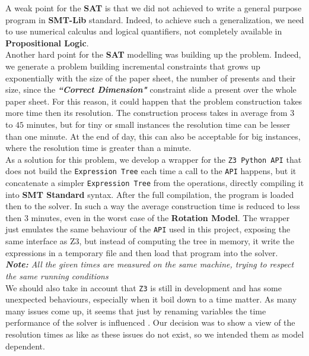 A weak point for the \textbf{SAT} is that we did not achieved to write a general purpose program in \textbf{SMT-Lib} standard. Indeed, to achieve such a generalization, we need to use
numerical calculus and logical quantifiers, not completely available in \textbf{Propositional Logic}.\\

Another hard point for the \textbf{SAT} modelling was building up the problem. Indeed, we generate a problem building incremental constraints that grows up exponentially with the size of
the paper sheet, the number of presents and their size, since the \textbf{\textit{``Correct Dimension"}} constraint slide a present over the whole paper sheet. For this reason, it could happen
that the problem construction takes more time then its resolution. The construction process takes in average from $3$ to $45$ minutes, but for tiny or small instances the resolution time can be lesser
than one minute. At the end of day, this can also be acceptable for big instances, where the resolution time is greater than a minute.
\\
As a solution for this problem, we develop a wrapper for the \texttt{Z3 Python API} that does not build the \texttt{Expression Tree} each time a call to the \texttt{API} happens, but it concatenate a simpler
\texttt{Expression Tree} from the operations, directly compiling it into \textbf{SMT Standard} syntax. After the full compilation, the program is loaded then to the solver.
In such a way the average construction time is reduced to less then $3$ minutes, even in the worst case of the \textbf{Rotation Model}.
The wrapper just emulates the same behaviour of the \texttt{API} used in this project, exposing the same interface as Z3, but instead of computing the tree in memory, it write the expressions in
a temporary file and then load that program into the solver. \\
\textit{\textbf{Note:} All the given times are measured on the same machine, trying to respect the same running conditions}\\

We should also take in account that \texttt{Z3} is still in development and has some unexpected behaviours, especially when it boil down to a time matter.
As many many issues come up, it seems that just by renaming variables the time performance of the solver is influenced \cite{z3issues}.
Our decision was to show a view of the resolution times as like as these issues do not exist, so we intended them as model dependent.

